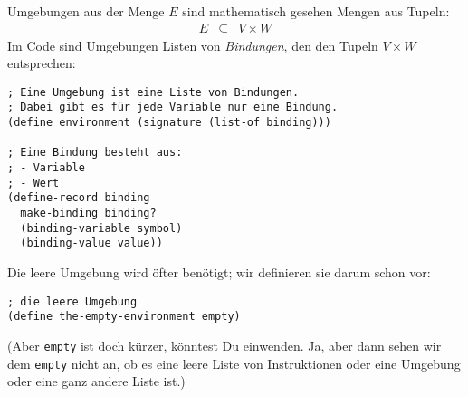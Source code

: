 Umgebungen aus der Menge $E$ sind mathematisch gesehen Mengen aus
Tupeln:
%
\begin{eqnarray*}
  E &\subseteq& V\times W
\end{eqnarray*}
%
Im Code sind Umgebungen Listen von
\textit{Bindungen}, den den Tupeln
$V\times W$ entsprechen:
%
\begin{lstlisting}
; Eine Umgebung ist eine Liste von Bindungen.
; Dabei gibt es für jede Variable nur eine Bindung.
(define environment (signature (list-of binding)))

; Eine Bindung besteht aus:
; - Variable
; - Wert
(define-record binding
  make-binding binding?
  (binding-variable symbol)
  (binding-value value))
\end{lstlisting}
% 
Die leere Umgebung wird öfter benötigt; wir definieren sie darum schon
vor:
%
\begin{lstlisting}
; die leere Umgebung
(define the-empty-environment empty)
\end{lstlisting}
%
(Aber \lstinline{empty} ist doch kürzer, könntest Du einwenden.  Ja,
aber dann sehen wir dem \lstinline{empty} nicht an, ob es eine leere
Liste von Instruktionen oder eine Umgebung oder eine ganz andere Liste
ist.)

